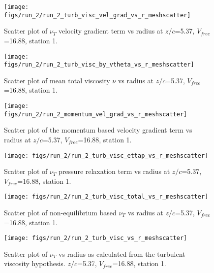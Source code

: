\begin{figure}[H]
\centering
\texttt{[image: figs/run\_2/run\_2\_turb\_visc\_vel\_grad\_vs\_r\_meshscatter]}
\caption{Scatter plot of $\nu_T$ velocity gradient term vs radius at $z/c$=5.37, $V_{free}$=16.88, station 1.}
\end{figure}


\begin{figure}[H]
\centering
\texttt{[image: figs/run\_2/run\_2\_turb\_visc\_by\_vtheta\_vs\_r\_meshscatter]}
\caption{Scatter plot of mean total viscosity $\nu$ vs radius at $z/c$=5.37, $V_{free}$=16.88, station 1.}
\end{figure}


\begin{figure}[H]
\centering
\texttt{[image: figs/run\_2/run\_2\_momentum\_vel\_grad\_vs\_r\_meshscatter]}
\caption{Scatter plot of the momentum based velocity gradient term vs radius at $z/c$=5.37, $V_{free}$=16.88, station 1.}
\end{figure}


\begin{figure}[H]
\centering
\texttt{[image: figs/run\_2/run\_2\_turb\_visc\_ettap\_vs\_r\_meshscatter]}
\caption{Scatter plot of $\nu_T$ pressure relaxation term vs radius at $z/c$=5.37, $V_{free}$=16.88, station 1.}
\end{figure}


\begin{figure}[H]
\centering
\texttt{[image: figs/run\_2/run\_2\_turb\_visc\_total\_vs\_r\_meshscatter]}
\caption{Scatter plot of non-equilibrium based $\nu_T$ vs radius at $z/c$=5.37, $V_{free}$=16.88, station 1.}
\end{figure}


\begin{figure}[H]
\centering
\texttt{[image: figs/run\_2/run\_2\_turb\_visc\_vs\_r\_meshscatter]}
\caption{Scatter plot of $\nu_T$ vs radius as calculated from the turbulent viscosity hypothesis. $z/c$=5.37, $V_{free}$=16.88, station 1.}
\end{figure}


